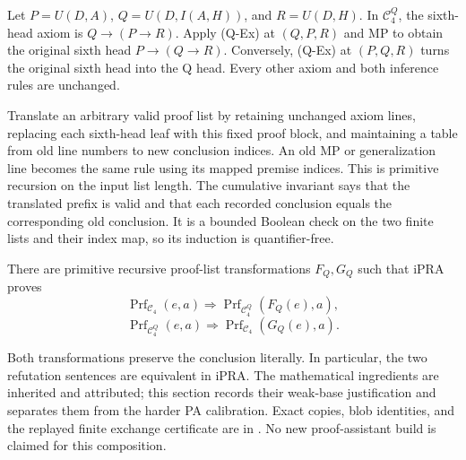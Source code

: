 Let $P=U(D,A)$, $Q=U(D,I(A,H))$, and $R=U(D,H)$.
In $\mathcal C_4^Q$, the sixth-head axiom is $Q\to(P\to R)$.
Apply (Q-Ex) at $(Q,P,R)$ and MP to obtain the original sixth head
$P\to(Q\to R)$.  Conversely, (Q-Ex) at $(P,Q,R)$ turns the original
sixth head into the Q head.  Every other axiom and both inference rules
are unchanged.

Translate an arbitrary valid proof list by retaining unchanged axiom
lines, replacing each sixth-head leaf with this fixed proof block, and
maintaining a table from old line numbers to new conclusion indices.
An old MP or generalization line becomes the same rule using its mapped
premise indices.  This is primitive recursion on the input list length.
The cumulative invariant says that the translated prefix is valid and
that each recorded conclusion equals the corresponding old conclusion.
It is a bounded Boolean check on the two finite lists and their index
map, so its induction is quantifier-free.

\begin{theorem}
There are primitive recursive proof-list transformations $F_Q,G_Q$ such
that iPRA proves
\[
 \operatorname{Prf}_{\mathcal C_4}(e,a)
 \Longrightarrow\operatorname{Prf}_{\mathcal C_4^Q}(F_Q(e),a),
\]
\[
 \operatorname{Prf}_{\mathcal C_4^Q}(e,a)
 \Longrightarrow\operatorname{Prf}_{\mathcal C_4}(G_Q(e),a).
\]
\end{theorem}

Both transformations preserve the conclusion literally.  In particular,
the two refutation sentences are equivalent in iPRA.  The mathematical
ingredients are inherited and attributed; this section records their
weak-base justification and separates them from the harder PA calibration.
Exact copies, blob identities, and the replayed finite exchange certificate
are in .  No new proof-assistant build is
claimed for this composition.
